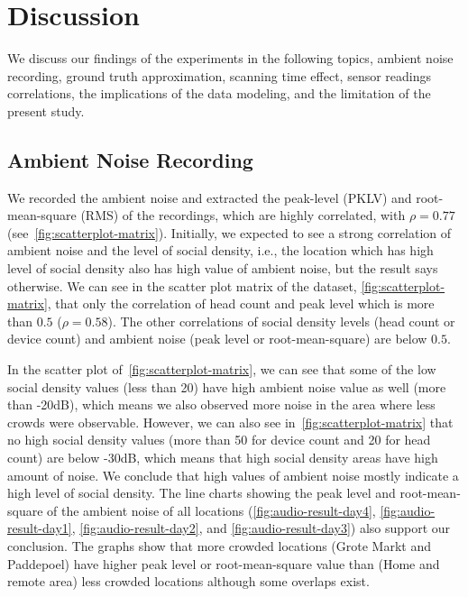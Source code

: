 \chapter{Discussion}
\label{ch:discussion} %
We discuss our findings of the experiments in the following topics, ambient noise recording, ground truth approximation, scanning time effect, sensor readings correlations, the implications of the data modeling, and the limitation of the present study.

\section{Ambient Noise Recording} %
\label{sec:ambient_noise_recording}
We recorded the ambient noise and extracted the peak-level (\ac{PKLV}) and root-mean-square (\ac{RMS}) of the recordings, which are highly correlated, with $\rho=0.77$ (see~\autoref{fig:scatterplot-matrix}). Initially, we expected to see a strong correlation of ambient noise and the level of social density, i.e., the location which has high level of social density also has high value of ambient noise, but the result says otherwise. We can see in the scatter plot matrix of the dataset, \autoref{fig:scatterplot-matrix}, that only the correlation of head count and peak level which is more than $0.5$ ($\rho=0.58$). The other correlations of social density levels (head count or device count) and ambient noise (peak level or root-mean-square) are below $0.5$.

In the scatter plot of~\autoref{fig:scatterplot-matrix}, we can see that some of the low social density values (less than 20) have high ambient noise value as well (more than -20dB), which means we also observed more noise in the area where less crowds were observable. However, we can also see in~\autoref{fig:scatterplot-matrix} that no high social density values (more than 50 for device count and 20 for head count) are below -30dB, which means that high social density areas have high amount of noise. We conclude that high values of ambient noise mostly indicate a high level of social density. The line charts showing the peak level and root-mean-square of the ambient noise of all locations (\autoref{fig:audio-result-day4}, \autoref{fig:audio-result-day1}, \autoref{fig:audio-result-day2}, and \autoref{fig:audio-result-day3}) also support our conclusion. The graphs show that more crowded locations (Grote Markt and Paddepoel) have higher peak level or root-mean-square value than (Home and remote area) less crowded locations although some overlaps exist.

